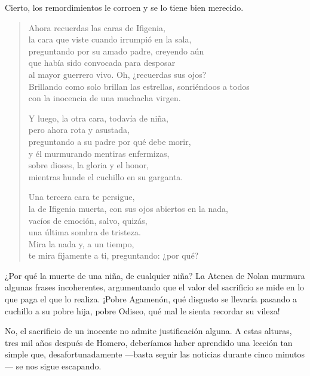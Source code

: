 Cierto, los remordimientos le corroen y se lo tiene bien merecido.

\begin{verse}
Ahora recuerdas las caras de Ifigenia,\\
la cara que viste cuando irrumpió en la sala,\\
preguntando por su amado padre, creyendo aún\\
que había sido convocada para desposar\\
al mayor guerrero vivo. Oh, ¿recuerdas sus ojos?\\
Brillando como solo brillan las estrellas, sonriéndoos a todos\\
con la inocencia de una muchacha virgen.

Y luego, la otra cara, todavía de niña,\\
pero ahora rota y asustada,\\
preguntando a su padre por qué debe morir,\\
y él murmurando mentiras enfermizas,\\
sobre dioses, la gloria y el honor,\\
mientras hunde el cuchillo en su garganta.

Una tercera cara te persigue,\\
la de Ifigenia muerta, con sus ojos abiertos en la nada,\\
vacíos de emoción, salvo, quizás,\\
una última sombra de tristeza.\\
Mira la nada y, a un tiempo,\\
te mira fijamente a ti, preguntando: ¿por qué?
\end{verse}

¿Por qué la muerte de una niña, de cualquier niña? La Atenea de Nolan murmura algunas frases incoherentes, argumentando que el valor del sacrificio se mide en lo que paga el que lo realiza. ¡Pobre Agamenón, qué disgusto se llevaría pasando a cuchillo a su pobre hija, pobre Odiseo, qué mal le sienta recordar su vileza!

No, el sacrificio de un inocente no admite justificación alguna. A estas alturas, tres mil años después de Homero, deberíamos haber aprendido una lección tan simple que, desafortunadamente ---basta seguir las noticias durante cinco minutos--- se nos sigue escapando.
